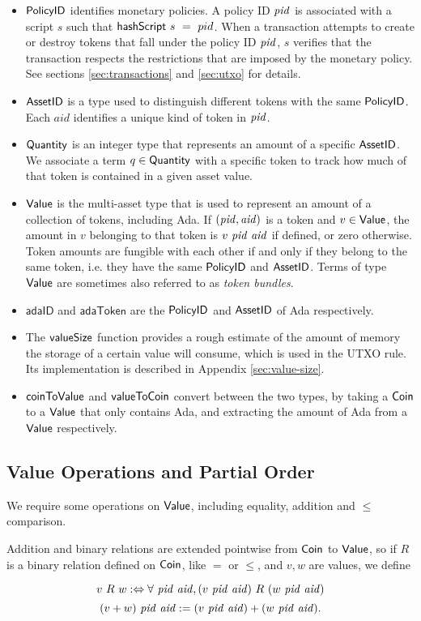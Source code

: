 \begin{itemize}
  \item $\mathsf{PolicyID}$ identifies monetary policies. A policy ID $\mathit{pid}$ is associated with a script
    $s$ such that $\mathsf{hashScript}~s~=~pid$. When a transaction attempts to create or destroy tokens
    that fall under the policy ID $\mathit{pid}$,
    $s$ verifies that the transaction
    respects the restrictions that are imposed by the monetary policy.
    See sections \ref{sec:transactions} and \ref{sec:utxo} for details.

  \item $\mathsf{AssetID}$ is a type used to distinguish different tokens with the same $\mathsf{PolicyID}$.
    Each $aid$ identifies a unique kind of token in $\mathit{pid}$.

  \item $\mathsf{Quantity}$ is an integer type that represents an amount of a specific $\mathsf{AssetID}$. We associate
    a term $q\in\mathsf{Quantity}$ with a specific token to track how much of that token is contained in a given asset value.

  \item $\mathsf{Value}$ is the multi-asset type that is used to represent
    an amount of a collection of tokens, including Ada. If $(\mathit{pid}, \mathit{aid})$ is a token and $v \in \mathsf{Value}$,
    the amount in $v$ belonging to that token is $v~\mathit{pid}~\mathit{aid}$ if defined, or zero otherwise.
    Token amounts are fungible with each other if and only if they belong to the same token,
    i.e. they have the same $\mathsf{PolicyID}$ and $\mathsf{AssetID}$. Terms of type $\mathsf{Value}$ are sometimes also referred to as
    \emph{token bundles}.

  \item $\mathsf{adaID}$ and $\mathsf{adaToken}$ are the $\mathsf{PolicyID}$ and $\mathsf{AssetID}$ of Ada respectively.

  \item The $\mathsf{valueSize}$ function provides a rough estimate of
    the amount of memory the storage of a certain value will consume, which is used in the UTXO rule.
    Its implementation is described in Appendix \ref{sec:value-size}.

  \item $\mathsf{coinToValue}$ and $\mathsf{valueToCoin}$ convert between the two types,
  by taking a $\mathsf{Coin}$ to a $\mathsf{Value}$ that only contains Ada, and extracting the amount of Ada from a $\mathsf{Value}$ respectively.
\end{itemize}

\subsection*{Value Operations and Partial Order}
We require some operations on $\mathsf{Value}$, including equality, addition and $\leq$ comparison.

Addition and binary relations are extended pointwise from $\mathsf{Coin}$ to $\mathsf{Value}$, so if $R$ is a binary relation defined on $\mathsf{Coin}$, like $=$ or $\leq$, and $v, w$ are values, we define

\[ v~R~w :\Leftrightarrow \forall~\mathit{pid}~\mathit{aid}, (v~\mathit{pid}~\mathit{aid})~R~(w~\mathit{pid}~\mathit{aid}) \]
\[ (v + w)~\mathit{pid}~\mathit{aid} := (v~\mathit{pid}~\mathit{aid}) + (w~\mathit{pid}~\mathit{aid}). \]

